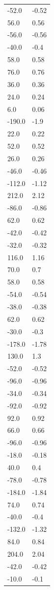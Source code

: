 \begin{longtable}{ll}
-52.0 & -0.52 \\
56.0 & 0.56 \\
-56.0 & -0.56 \\
-40.0 & -0.4 \\
58.0 & 0.58 \\
76.0 & 0.76 \\
36.0 & 0.36 \\
24.0 & 0.24 \\
6.0 & 0.06 \\
-190.0 & -1.9 \\
22.0 & 0.22 \\
52.0 & 0.52 \\
26.0 & 0.26 \\
-46.0 & -0.46 \\
-112.0 & -1.12 \\
212.0 & 2.12 \\
-86.0 & -0.86 \\
62.0 & 0.62 \\
-42.0 & -0.42 \\
-32.0 & -0.32 \\
116.0 & 1.16 \\
70.0 & 0.7 \\
58.0 & 0.58 \\
-54.0 & -0.54 \\
-38.0 & -0.38 \\
62.0 & 0.62 \\
-30.0 & -0.3 \\
-178.0 & -1.78 \\
130.0 & 1.3 \\
-52.0 & -0.52 \\
-96.0 & -0.96 \\
-34.0 & -0.34 \\
-92.0 & -0.92 \\
92.0 & 0.92 \\
66.0 & 0.66 \\
-96.0 & -0.96 \\
-18.0 & -0.18 \\
40.0 & 0.4 \\
-78.0 & -0.78 \\
-184.0 & -1.84 \\
74.0 & 0.74 \\
-40.0 & -0.4 \\
-132.0 & -1.32 \\
84.0 & 0.84 \\
204.0 & 2.04 \\
-42.0 & -0.42 \\
-10.0 & -0.1 \\

\end{longtable}
